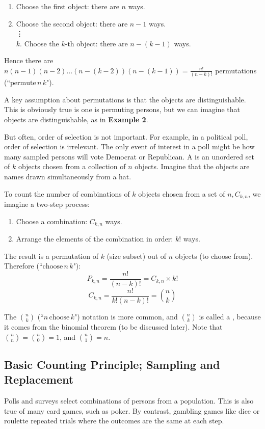 \begin{enumerate}
    \item Choose the first object: there are $n$ ways.
    \item Choose the second object: there are $n-1$ ways.\\
    \vdots\\
    $k$. Choose the $k$-th object: there are $n-(k-1)$ ways. 
\end{enumerate}
Hence there are $n(n-1)(n-2)\hdots(n-(k-2))(n-(k-1))=\frac{n!}{(n-k)!}$ permutations (``$\text{permute}\,n\,k$").

A key assumption about permutations is that the objects are distinguishable. This is obviously true is one is permuting persons, but we can imagine that objects are distinguishable, as in \textbf{Example 2}.

But often, order of selection is not important. For example, in a political poll, order of selection is irrelevant. The only event of interest in a poll might be how many sampled persons will vote Democrat or Republican. A  is an unordered set of $k$ objects chosen from a collection of $n$ objects. Imagine that the objects are names drawn simultaneously from a hat.
 
To count the number of combinations of $k$ objects chosen from a set of $n, C_{k,n}$, we imagine a two-step process:
\begin{enumerate}
    \item Choose a combination: $C_{k,n}$ ways.
    \item Arrange the elements of the combination in order: $k!$ ways.
\end{enumerate}

The result is a permutation of $k$ (size subset) out of $n$ objects (to choose from). Therefore (``$\text{choose}\,n\,k$"):
$$P_{k,n} = \frac{n!}{(n-k)!} = C_{k,n} \times k!$$
$$C_{k,n} = \frac{n!}{k!(n-k)!} = {n \choose k}$$

The $n \choose k$ (``$n \, \text{choose} \,k$") notation is more common, and $n \choose k$ is called a , because it comes from the binomial theorem (to be discussed later). Note that ${n \choose n} = {n \choose 0} = 1$, and ${n \choose 1} = n$.

\subsection{Basic Counting Principle; Sampling and Replacement}
Polls and surveys select combinations of persons from a population. This is also true of many card games, such as poker. By contrast, gambling games like dice or roulette repeated trials where the outcomes are the same at each step.

